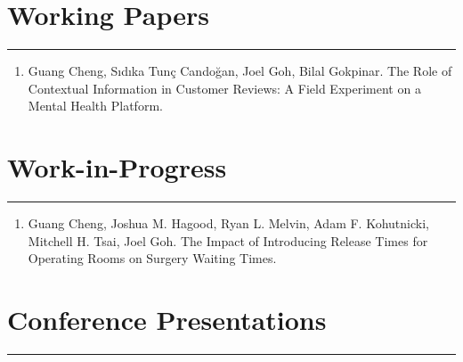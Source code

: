\documentclass[12pt, a4paper]{article}
\begin{document}
{\section*{Working Papers}
\vspace*{0.4em}
\hrule height 0.5pt

\begin{enumerate}[leftmargin=28pt, itemsep=6pt, parsep=0.2pt, topsep=1pt]

	\item Guang Cheng, S\i{}d\i{}ka Tun\c{c} Cando\u{g}an, Joel Goh, Bilal Gokpinar.
	The Role of Contextual Information in Customer Reviews: A Field Experiment on a Mental Health Platform.

\end{enumerate}




\section*{Work-in-Progress}
\vspace*{0.4em}
\hrule height 0.5pt

\begin{enumerate}[leftmargin=28pt, itemsep=6pt, parsep=0.2pt, topsep=1pt]

	\item Guang Cheng, Joshua M. Hagood, Ryan L. Melvin, Adam F. Kohutnicki, Mitchell H. Tsai, Joel Goh. The Impact of Introducing Release Times for Operating Rooms on Surgery Waiting Times.

\end{enumerate}




\section*{Conference Presentations}
\vspace*{0.4em}
\hrule height 0.5pt

\begin{itemize}[leftmargin=26pt, itemsep=8pt, parsep=0.2pt, topsep=1pt]


\end{itemize}}
\end{document}
